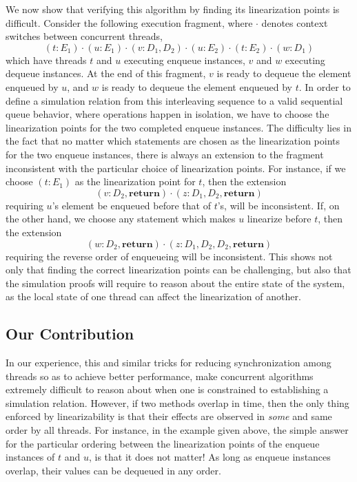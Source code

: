 \documentclass{LMCS}
\begin{document}
We now show that verifying this algorithm by finding its linearization points is difficult.
Consider the following execution fragment, where $\cdot$ denotes context switches between concurrent threads,
\[
(t:E_1)\cdot (u:E_1) \cdot (v:D_1,D_2)\cdot (u:E_2) \cdot (t:E_2) \cdot (w:D_1)
\]
which have threads $t$ and $u$ executing enqueue instances, $v$ and $w$ executing dequeue instances. 
At the end of this fragment, $v$ is ready to dequeue the element enqueued by $u$, and $w$ is ready to dequeue the element enqueued by $t$.
In order to define a simulation relation from this interleaving sequence to a valid sequential queue behavior, where operations happen in isolation, we have to choose the linearization points for the two completed enqueue instances. 
The difficulty lies in the fact that no matter which statements are chosen as the linearization points for the two enqueue instances, there is always an extension to the fragment inconsistent with the particular choice of linearization points. 
For instance, if we choose $(t:E_1)$ as the linearization point for $t$, then the extension 
\[
(v:D_2,\textbf{return}) \cdot (z:D_1,D_2,\textbf{return})
\]
requiring $u$'s element be enqueued before that of $t$'s, will be inconsistent.
If, on the other hand, we choose any statement which makes $u$ linearize before $t$, then the extension
\[
(w:D_2,\textbf{return}) \cdot (z:D_1,D_2,D_2,\textbf{return})
\]
requiring the reverse order of enqueueing will be inconsistent. 
This shows not only that finding the correct linearization points can be challenging,
but also that the simulation proofs will require to reason about the entire state of the
system,
as the local state of one thread can affect the linearization of another.


\subsection*{Our Contribution}

In our experience, this and similar tricks for reducing synchronization among threads so as to achieve better performance, make concurrent algorithms extremely difficult to reason about when one is constrained to establishing a simulation relation.
However, if two methods overlap in time, then the only thing enforced by linearizability is that their effects are observed in {\em some} and same order by all threads.
For instance, in the example given above, the simple answer for the particular ordering between the linearization points of the enqueue instances of $t$ and $u$, is that it does not matter!
As long as enqueue instances overlap, their values can be dequeued in any order.
\end{document}
